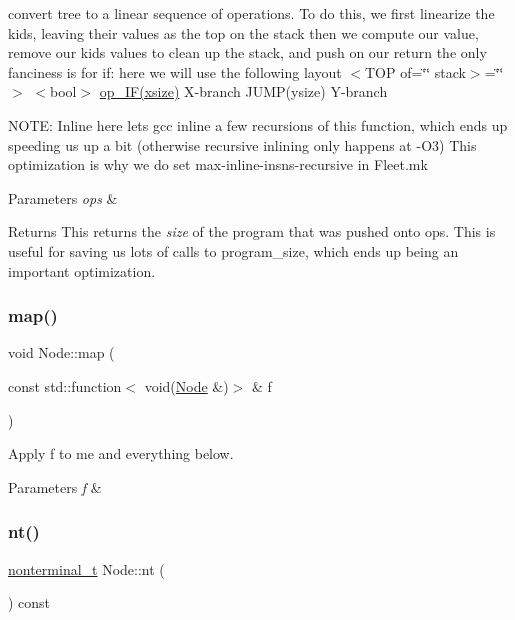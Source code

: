 convert tree to a linear sequence of operations. To do this, we first linearize the kids, leaving their values as the top on the stack then we compute our value, remove our kids\textquotesingle{} values to clean up the stack, and push on our return the only fanciness is for if\+: here we will use the following layout $<$\+T\+O\+P of=\char`\"{}\char`\"{} stack$>$=\char`\"{}\char`\"{}$>$ $<$bool$>$ \hyperlink{_instruction_8h_af2fb7c87c5854c5733d7bb0506b06de7a8f69a9fe993189d72cf7b07e8517801d}{op\+\_\+\+I\+F(xsize)} X-\/branch J\+U\+M\+P(ysize) Y-\/branch

N\+O\+TE\+: Inline here lets gcc inline a few recursions of this function, which ends up speeding us up a bit (otherwise recursive inlining only happens at -\/\+O3) This optimization is why we do set max-\/inline-\/insns-\/recursive in Fleet.\+mk 
\begin{DoxyParams}{Parameters}
{\em ops} & \\
\hline
\end{DoxyParams}
\begin{DoxyReturn}{Returns}
This returns the {\itshape size} of the program that was pushed onto ops. This is useful for saving us lots of calls to program\+\_\+size, which ends up being an important optimization.
\end{DoxyReturn}
\mbox{\label{class_node_adefac3cb7b411321c5af15dad1484834}} 
\subsubsection{\texorpdfstring{map()}{map()}}
{\footnotesize\ttfamily void Node\+::map (\begin{DoxyParamCaption}\item[{const std\+::function$<$ void(\hyperlink{class_node}{Node} \&)$>$ \&}]{f }\end{DoxyParamCaption})\hspace{0.3cm}{\ttfamily [inline]}}

Apply f to me and everything below. 
\begin{DoxyParams}{Parameters}
{\em f} & \\
\hline
\end{DoxyParams}
\mbox{\label{class_node_a4abe3acdc804489a01ef13a25b130fd8}} 
\subsubsection{\texorpdfstring{nt()}{nt()}}
{\footnotesize\ttfamily \hyperlink{_nonterminal_8h_a1c5bfe9b903f69c83bbde5da7035fef3}{nonterminal\+\_\+t} Node\+::nt (\begin{DoxyParamCaption}{ }\end{DoxyParamCaption}) const\hspace{0.3cm}{\ttfamily [inline]}}

